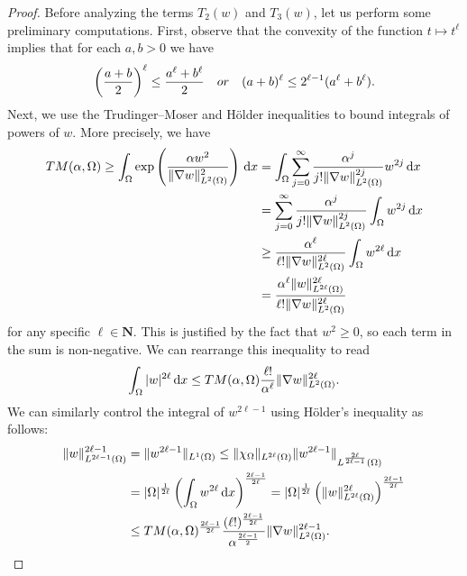 \documentclass[10pt,a4paper]{amsart}
\newcommand{\ud}{\,\mathrm{d}}
\begin{document}
\begin{proof}
Before analyzing the terms $T_2(w)$ and $T_3(w)$,
let us perform some preliminary computations. 
First, observe that the convexity of the function $t \mapsto t^\ell$ implies that 
for each $a,b >0$ we have 
\begin{equation}\label{convex_power}
\left ( \frac{a + b}{2} \right )^\ell \leq \frac{a^\ell + b^\ell}{2} \quad {\rm or} \quad
(a+b)^\ell \leq 2^{\ell-1} (a^\ell + b^\ell ).
\end{equation} 
Next, we use the Trudinger--Moser and H\"older 
inequalities to bound integrals of powers of $w$. 
More precisely, we have 
    \begin{align*} 
    {\rm TM}(\alpha,\Omega) \geq \int_\Omega \exp \left (\frac{\alpha w^2}{\| \nabla w\|_{L^2(\Omega)}^2} \right ) \ud x 
    & = \int_\Omega \sum_{j = 0}^\infty \frac{\alpha^j}{j ! 
    \| \nabla w \|_{L^2(\Omega)}^{2j} }w^{2j}\ud x\\
    &= \sum_{j = 0}^\infty \frac{\alpha^j}
    {j ! \| \nabla w\|_{L^2(\Omega)}^{2j}} 
    \int_\Omega w^{2j} \ud x \\ 
    & \geq \frac{\alpha^\ell}{\ell! \| \nabla w \|_{L^2(\Omega)} ^{2\ell}} 
    \int_\Omega w^{2\ell} \ud x\\
    &= \frac{\alpha^{\ell} \| w\|_{L^{2\ell}(\Omega)}^{2\ell}}
    {\ell! \| \nabla w\|_{L^2(\Omega)}^{2\ell} }
    \end{align*} 
    for any specific $\ell \in \mathbf{N}$. This is justified by the fact that $w^2 \geq 0$, 
    so each term in the sum is non-negative. We can rearrange this inequality to read 
    \begin{equation} \label{higher_order1}
    \int_\Omega |w|^{2\ell}\ud x \leq {\rm TM}(\alpha,\Omega)\frac{\ell!}{\alpha^\ell}
    \| \nabla w \|_{L^2(\Omega)}^{2\ell} . \end{equation}
    We can similarly control the integral of $w^{2\ell-1}$ using H\"older's inequality as follows: 
  \begin{align} \label{higher_order2} 
    \| w \|_{L^{2\ell-1}(\Omega)}^{2\ell -1} & =  \| w^{2\ell -1} \|_{L^1(\Omega)}    \leq \| \chi_{\Omega} \|_{L^{2\ell}(\Omega)} 
    \| w^{2\ell -1} \|_{L^{\frac{2\ell}{2\ell-1}}(\Omega)} \\ \nonumber 
    & = |\Omega|^{\frac{1}{2\ell}} \left ( \int_\Omega w^{2\ell} \ud x\right )^{\frac{2\ell-1}{2\ell}} 
    = |\Omega|^{\frac{1}{2\ell}} \left ( 
    \| w \|_{L^{2\ell}(\Omega)}^{2\ell} \right )^{\frac{2\ell-1}{2\ell}} \\ \nonumber 
    & \leq {\rm TM}(\alpha,\Omega)^{\frac{2\ell-1}{2\ell}} \frac{(\ell !)^{\frac{2\ell-1}{2\ell}}}
    {\alpha^{\frac{2\ell-1}{2}}} \| \nabla w\|_{L^2(\Omega)}^{2\ell -1}.
    \end{align} 


\end{proof}
\end{document}
